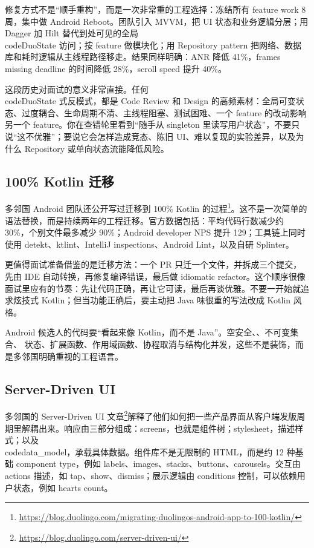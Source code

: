 修复方式不是“顺手重构”，而是一次非常重的工程选择：冻结所有 feature work 8 周，集中做 Android Reboot。团队引入 MVVM，把 UI 状态和业务逻辑分层；用 Dagger 加 Hilt 替代到处可见的全局 \\code{DuoState} 访问；按 feature 做模块化；用 Repository pattern 把网络、数据库和耗时逻辑从主线程路径移走。结果同样明确：ANR 降低 41\%，frames missing deadline 的时间降低 28\%，scroll speed 提升 40\%。

这段历史对面试的意义非常直接。任何 \\code{DuoState} 式反模式，都是 Code Review 和 Design 的高频素材：全局可变状态、过度耦合、生命周期不清、主线程阻塞、测试困难、一个 feature 的改动影响另一个 feature。你在查错轮里看到“随手从 singleton 里读写用户状态”，不要只说“这不优雅”；要说它会怎样造成竞态、陈旧 UI、难以复现的实验差异，以及为什么 Repository 或单向状态流能降低风险。

\subsection{100\% Kotlin 迁移}

\srcofficial 多邻国 Android 团队还公开写过迁移到 100\% Kotlin 的过程\footnote{\url{https://blog.duolingo.com/migrating-duolingos-android-app-to-100-kotlin/}}。这不是一次简单的语法替换，而是持续两年的工程迁移。官方数据包括：平均代码行数减少约 30\%，个别文件最多减少 90\%；Android developer NPS 提升 129；工具链上同时使用 detekt、ktlint、IntelliJ inspections、Android Lint，以及自研 Splinter。

更值得面试准备借鉴的是迁移方法：一个 PR 只迁一个文件，并拆成三个提交，先由 IDE 自动转换，再修复编译错误，最后做 idiomatic refactor。这个顺序很像面试里应有的节奏：先让代码正确，再让它可读，最后再谈优雅。不要一开始就追求炫技式 Kotlin；但当功能正确后，要主动把 Java 味很重的写法改成 Kotlin 风格。

\begin{keypoint}
Android 候选人的代码要“看起来像 Kotlin，而不是 Java”。空安全、、不可变集合、 状态、扩展函数、作用域函数、协程取消与结构化并发，这些不是装饰，而是多邻国明确重视的工程语言。
\end{keypoint}

\subsection{Server-Driven UI}

\srcofficial 多邻国的 Server-Driven UI 文章\footnote{\url{https://blog.duolingo.com/server-driven-ui/}}解释了他们如何把一些产品界面从客户端发版周期里解耦出来。响应由三部分组成：screens，也就是组件树；stylesheet，描述样式；以及 \\code{data\_model}，承载具体数据。组件库不是无限制的 HTML，而是约 12 种基础 component type，例如 labels、images、stacks、buttons、carousels。交互由 actions 描述，如 tap、show、dismiss；展示逻辑由 conditions 控制，可以依赖用户状态，例如 hearts count。

